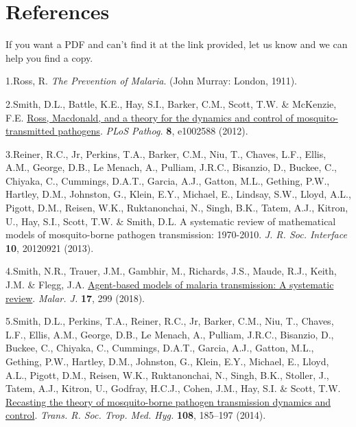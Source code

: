 \documentclass[
]{book}
\newlength{\cslhangindent}
\newlength{\cslentryspacingunit} %
\newenvironment{CSLReferences}[2] %
 {%
  \setlength{\parindent}{0pt}
  \ifodd #1
  \let\oldpar\par
  \def\par{\hangindent=\cslhangindent\oldpar}
  \fi
  \setlength{\parskip}{#2\cslentryspacingunit}
 }%
 {}
\begin{document}
\hypertarget{references}{%
\chapter{References}\label{references}}

If you want a PDF and can't find it at the link provided, let us know and we can help you find a copy.

\hypertarget{refs}{}
\begin{CSLReferences}{0}{0}
\leavevmode{}%
1.Ross, R. \emph{The {Prevention} of {Malaria}}. (John Murray: London, 1911).

\leavevmode{}%
2.Smith, D.L., Battle, K.E., Hay, S.I., Barker, C.M., Scott, T.W. \& McKenzie, F.E. \href{https://doi.org/10.1371/journal.ppat.1002588}{Ross, {Macdonald}, and a theory for the dynamics and control of mosquito-transmitted pathogens}. \emph{PLoS Pathog.} \textbf{8}, e1002588 (2012).

\leavevmode{}%
3.Reiner, R.C., Jr, Perkins, T.A., Barker, C.M., Niu, T., Chaves, L.F., Ellis, A.M., George, D.B., Le Menach, A., Pulliam, J.R.C., Bisanzio, D., Buckee, C., Chiyaka, C., Cummings, D.A.T., Garcia, A.J., Gatton, M.L., Gething, P.W., Hartley, D.M., Johnston, G., Klein, E.Y., Michael, E., Lindsay, S.W., Lloyd, A.L., Pigott, D.M., Reisen, W.K., Ruktanonchai, N., Singh, B.K., Tatem, A.J., Kitron, U., Hay, S.I., Scott, T.W. \& Smith, D.L. A systematic review of mathematical models of mosquito-borne pathogen transmission: 1970-2010. \emph{J. R. Soc. Interface} \textbf{10}, 20120921 (2013).

\leavevmode{}%
4.Smith, N.R., Trauer, J.M., Gambhir, M., Richards, J.S., Maude, R.J., Keith, J.M. \& Flegg, J.A. \href{https://doi.org/10.1186/s12936-018-2442-y}{Agent-based models of malaria transmission: {A} systematic review}. \emph{Malar. J.} \textbf{17}, 299 (2018).

\leavevmode{}%
5.Smith, D.L., Perkins, T.A., Reiner, R.C., Jr, Barker, C.M., Niu, T., Chaves, L.F., Ellis, A.M., George, D.B., Le Menach, A., Pulliam, J.R.C., Bisanzio, D., Buckee, C., Chiyaka, C., Cummings, D.A.T., Garcia, A.J., Gatton, M.L., Gething, P.W., Hartley, D.M., Johnston, G., Klein, E.Y., Michael, E., Lloyd, A.L., Pigott, D.M., Reisen, W.K., Ruktanonchai, N., Singh, B.K., Stoller, J., Tatem, A.J., Kitron, U., Godfray, H.C.J., Cohen, J.M., Hay, S.I. \& Scott, T.W. \href{https://doi.org/10.1093/trstmh/tru026}{Recasting the theory of mosquito-borne pathogen transmission dynamics and control}. \emph{Trans. R. Soc. Trop. Med. Hyg.} \textbf{108}, 185--197 (2014).


\end{CSLReferences}
\end{document}

